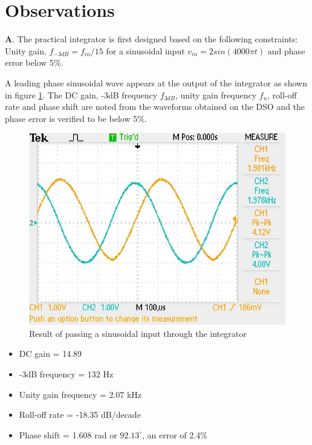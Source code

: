 \documentclass[12pt, titlepage]{article}
\theoremstyle{definition}
\begin{document}
  \newpage
  \section{Observations}
    \textbf{A}. The practical integrator is first designed based on the following constraints:
    Unity gain, $f_{-3dB} = f_{in}/15$ for a sinusoidal input
    $v_{in} = 2 sin(4000\pi t)$ and phase error below 5\%.

    A leading phase sinusoidal wave appears at the output of the integrator as shown in figure \ref{fig:results_q1}.
    The DC gain, -3dB frequency $f_{3dB}$, unity gain frequency $f_u$, roll-off rate and phase shift are noted from the waveforms obtained on the DSO and the phase error is verified to be below 5\%.

    \begin{figure}
      \includegraphics[scale=0.25]{images/results_q1.jpeg}
      \caption{Result of passing a sinusoidal input through the integrator}
      \label{fig:results_q1}
    \end{figure}

    \begin{itemize}
      \item[] DC gain = 14.89
      \item[] -3dB frequency = 132 Hz
      \item[] Unity gain frequency = 2.07 kHz
      \item[] Roll-off rate = -18.35 dB/decade
      \item[] Phase shift = 1.608 rad or $92.13^{\circ}$, an error of 2.4\%
    \end{itemize}
\end{document}
